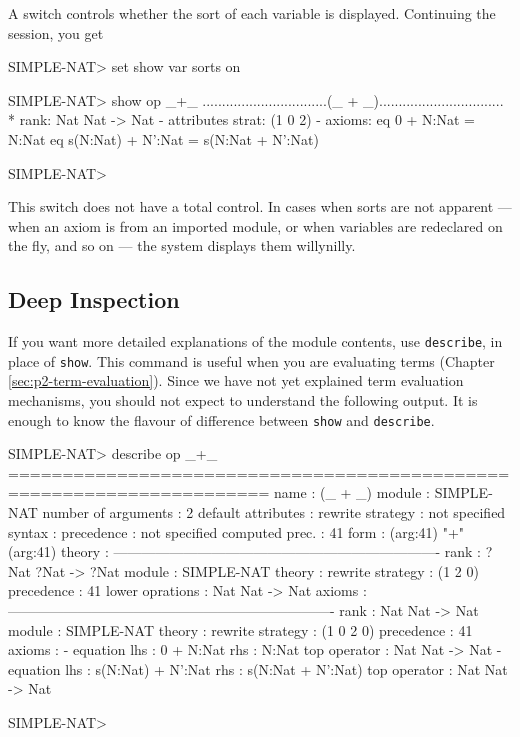 \documentclass[a4paper]{memoir}
\begin{document}
A switch controls whether the sort of each variable is displayed.
Continuing the session, you get
\begin{vvtm}
\begin{ccode}
  SIMPLE-NAT> set show var sorts on

  SIMPLE-NAT> show op _+_
  ................................(_ + _)................................
    * rank: Nat Nat -> Nat
      - attributes { strat: (1 0 2) }
      - axioms:
        eq 0 + N:Nat = N:Nat
        eq s(N:Nat) + N':Nat = s(N:Nat + N':Nat)

  SIMPLE-NAT>
\end{ccode}
\end{vvtm}
\begin{warning}
  This switch does not have a total control. In cases when sorts
  are not apparent --- when an axiom is from an imported module, or
  when variables are redeclared on the fly, and so on --- the system displays
  them willynilly.
\end{warning}

\subsection{Deep Inspection}\label{sec:p2-deep-inspection}

If you want more detailed explanations of the module contents, use
\verb|describe|, in place of \verb|show|.
This command is useful when you are evaluating terms
(Chapter \ref{sec:p2-term-evaluation}). Since we have not yet
explained term evaluation mechanisms, you should not expect to
understand the following output. It is enough to know the
flavour of difference between \verb|show| and \verb|describe|.
\begin{vvtm}
\begin{ccode}
  SIMPLE-NAT> describe op _+_
  ======================================================================
  name                : (_ + _)
  module              : SIMPLE-NAT
  number of arguments : 2
  default attributes  :
   rewrite strategy   : not specified
   syntax             :
     precedence       : not specified
     computed prec.   : 41
     form             : (arg:41) "+" (arg:41) 
   theory             : 
  ----------------------------------------------------------------------
  rank                : ?Nat ?Nat -> ?Nat
    module            : SIMPLE-NAT
    theory            : 
    rewrite strategy  : (1 2 0)
    precedence        : 41
    lower oprations   :
      Nat Nat -> Nat
    axioms            :
  ----------------------------------------------------------------------
  rank                : Nat Nat -> Nat
    module            : SIMPLE-NAT
    theory            : 
    rewrite strategy  : (1 0 2 0)
    precedence        : 41
    axioms            :
    - equation 
      lhs             : 0 + N:Nat
      rhs             : N:Nat
      top operator    : Nat Nat -> Nat
    - equation 
      lhs             : s(N:Nat) + N':Nat
      rhs             : s(N:Nat + N':Nat)
      top operator    : Nat Nat -> Nat

  SIMPLE-NAT> 
\end{ccode}
\end{vvtm}
\end{document}
